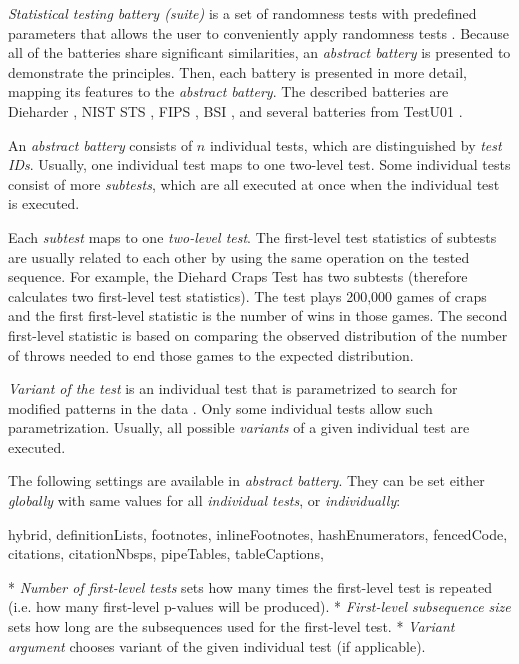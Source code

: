 \documentclass[
  digital,     %
  oneside,     %
  nosansbold,  %
  nocolorbold, %
  nolof,         %
  nolot,         %
]{fithesis4}
\begin{document}

\emph{Statistical testing battery (suite)} is a set of randomness tests with predefined parameters that allows the user to conveniently apply randomness tests \cite[p. 5]{tu01_guide}. Because all of the batteries share significant similarities, an \emph{abstract battery} is presented to demonstrate the principles. Then, each battery is presented in more detail, mapping its features to the \emph{abstract battery}. The described batteries are Dieharder \cite{dieharder_orig}, NIST STS \cite{nist_special}, FIPS \cite{fips_stand}, BSI \cite{bsi_stand}, and several batteries from TestU01 \cite{tu01_guide}.


An \emph{abstract battery} consists of $n$ individual tests, which are distinguished by \emph{test IDs}. Usually, one individual test maps to one two-level test. Some individual tests consist of more \emph{subtests}, which are all executed at once when the individual test is executed.

Each \emph{subtest} maps to one \emph{two-level test}. The first-level test statistics of subtests are usually related to each other by using the same operation on the tested sequence. For example, the Diehard Craps Test \cite{dieharder-git} has two subtests (therefore calculates two first-level test statistics). The test plays 200,000 games of craps and the first first-level statistic is the number of wins in those games. The second first-level statistic is based on comparing the observed distribution of the number of throws needed to end those games to the expected distribution.


\emph{Variant of the test} is an individual test that is parametrized to search for modified patterns in the data \cite[p. 2]{vavercak}. Only some individual tests allow such parametrization. Usually, all possible \emph{variants} of a given individual test are executed.

The following settings are available in \emph{abstract battery}. They can be set either \emph{globally} with same values for all \emph{individual tests}, or \emph{individually}:
\begin{markdown*}{%
  hybrid,
  definitionLists,
  footnotes,
  inlineFootnotes,
  hashEnumerators,
  fencedCode,
  citations,
  citationNbsps,
  pipeTables,
  tableCaptions,
}

* \emph{Number of first-level tests} sets how many times the first-level test is repeated (i.e. how many first-level p-values will be produced).
* \emph{First-level subsequence size} sets how long are the subsequences used for the first-level test.
* \emph{Variant argument} chooses variant of the given individual test (if applicable).


\end{markdown*}
\end{document}
